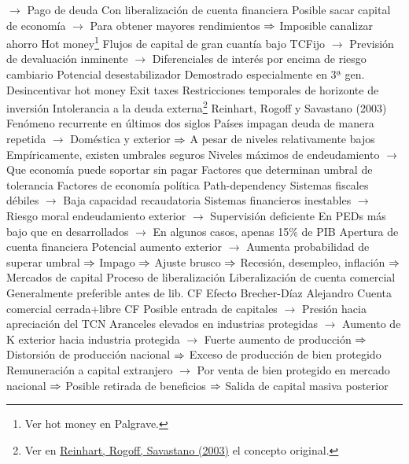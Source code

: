 \documentclass{nuevotema}
\begin{document}
\begin{esquemal}
				\4[] $\to$ Pago de deuda
				\4 Con liberalización de cuenta financiera
				\4[] Posible sacar capital de economía
				\4[] $\to$ Para obtener mayores rendimientos
				\4[] $\Rightarrow$ Imposible canalizar ahorro
			\3 Hot money\footnote{Ver hot money en Palgrave.}
				\4 Flujos de capital de gran cuantía bajo TCFijo
				\4[] $\to$ Previsión de devaluación inminente
				\4[] $\to$ Diferenciales de interés por encima de riesgo cambiario
				\4 Potencial desestabilizador
				\4[] Demostrado especialmente en 3ª gen.
				\4 Desincentivar hot money
				\4[] Exit taxes
				\4[] Restricciones temporales de horizonte de inversión
			\3 Intolerancia a la deuda externa\footnote{Ver en \href{https://www.nber.org/papers/w9908}{Reinhart, Rogoff, Savastano (2003)} el concepto original.}
				\4 Reinhart, Rogoff y Savastano (2003)
				\4 Fenómeno recurrente en últimos dos siglos
				\4[] Países impagan deuda de manera repetida
				\4[] $\to$ Doméstica y exterior
				\4[] $\Rightarrow$ A pesar de niveles relativamente bajos
				\4 Empíricamente, existen umbrales seguros
				\4[] Niveles máximos de endeudamiento
				\4[] $\to$ Que economía puede soportar sin pagar
				\4 Factores que determinan umbral de tolerancia
				\4[] Factores de economía política
				\4[] Path-dependency
				\4[] Sistemas fiscales débiles
				\4[] $\to$ Baja capacidad recaudatoria
				\4[] Sistemas financieros inestables
				\4[] $\to$ Riesgo moral endeudamiento exterior
				\4[] $\to$ Supervisión deficiente
				\4 En PEDs más bajo que en desarrollados
				\4[] $\to$ En algunos casos, apenas 15\% de PIB
				\4 Apertura de cuenta financiera
				\4[] Potencial aumento exterior
				\4[] $\to$ Aumenta probabilidad de superar umbral
				\4[] $\Rightarrow$ Impago
				\4[] $\Rightarrow$ Ajuste brusco
				\4[] $\Rightarrow$ Recesión, desempleo, inflación
				\4[] $\Rightarrow$ Mercados de capital
		\2 Proceso de liberalización
			\3 Liberalización de cuenta comercial
				\4 Generalmente preferible antes de lib. CF
				\4 Efecto Brecher-Díaz Alejandro
				\4[] Cuenta comercial cerrada+libre CF
				\4[] Posible entrada de capitales
				\4[] $\to$ Presión hacia apreciación del TCN
				\4[] Aranceles elevados en industrias protegidas
				\4[] $\to$ Aumento de K exterior hacia industria protegida
				\4[] $\to$ Fuerte aumento de producción
				\4[] $\Rightarrow$ Distorsión de producción nacional
				\4[] $\Rightarrow$ Exceso de producción de bien protegido
				\4[] Remuneración a capital extranjero
				\4[] $\to$ Por venta de bien protegido en mercado nacional
				\4[] $\Rightarrow$ Posible retirada de beneficios
				\4[] $\Rightarrow$ Salida de capital masiva posterior

\end{esquemal}
\end{document}
